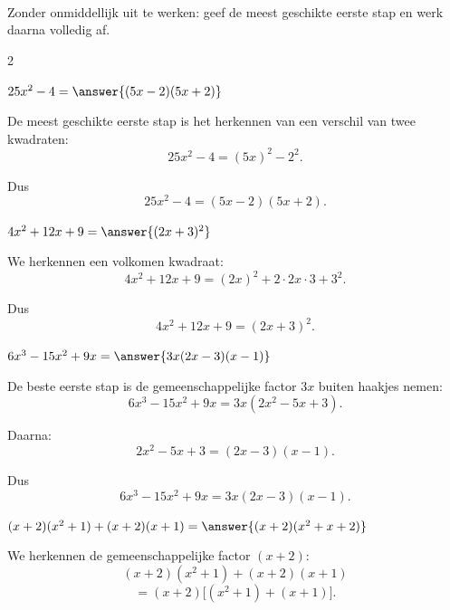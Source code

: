 \documentclass{ximera}
\begin{document}
    
    
    \begin{oefening}{\oefU\ESS}
    \\
    
    Zonder onmiddellijk uit te werken: geef de meest geschikte eerste stap en werk daarna volledig af.
    
    \begin{multicols}{2}
    
    \begin{question}
    $25x^2-4=\answer{(5x-2)(5x+2)}$
    
    \begin{oplossing}
    De meest geschikte eerste stap is het herkennen van een verschil van twee kwadraten:
    \[
    25x^2-4
    =(5x)^2-2^2.
    \]
    
    Dus
    \[
    25x^2-4
    =(5x-2)(5x+2).
    \]
    \end{oplossing}
    \end{question}
    
    
    \begin{question}
    $4x^2+12x+9=\answer{(2x+3)^2}$
    
    \begin{oplossing}
    We herkennen een volkomen kwadraat:
    \[
    4x^2+12x+9
    =(2x)^2+2\cdot2x\cdot3+3^2.
    \]
    
    Dus
    \[
    4x^2+12x+9
    =(2x+3)^2.
    \]
    \end{oplossing}
    \end{question}
    
    
    \begin{question}
    $6x^3-15x^2+9x=\answer{3x(2x-3)(x-1)}$
    
    \begin{oplossing}
    De beste eerste stap is de gemeenschappelijke factor $3x$ buiten haakjes nemen:
    \[
    6x^3-15x^2+9x
    =3x(2x^2-5x+3).
    \]
    
    Daarna:
    \[
    2x^2-5x+3
    =(2x-3)(x-1).
    \]
    
    Dus
    \[
    6x^3-15x^2+9x
    =3x(2x-3)(x-1).
    \]
    \end{oplossing}
    \end{question}
    
    
    \begin{question}
    $(x+2)(x^2+1)+(x+2)(x+1)
    =\answer{(x+2)(x^2+x+2)}$
    
    \begin{oplossing}
    We herkennen de gemeenschappelijke factor $(x+2)$:
    \[
    (x+2)(x^2+1)+(x+2)(x+1)
    \]
    \[
    =(x+2)\bigl[(x^2+1)+(x+1)\bigr].
    \]
    

\end{oplossing}
\end{question}
\end{multicols}
\end{oefening}
\end{document}
